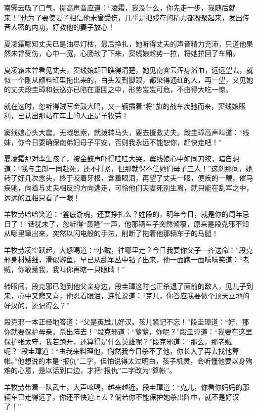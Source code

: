 \documentclass[12pt,oneside]{book}
\begin{document}
南霁云吸了口气，提高声音应道：``凌霜，我没什么，你先走一步，我随后就来！''他为了要使妻子相信他未曾受伤，几乎是把残存的精力都凝聚起来，发出传音人密的内功，好教他的妻子放心！

夏凌霜哪知丈夫已是油尽灯枯，最后挣扎，她听得丈夫的声音精力充沛，只道他果然未曾受伤，心中一宽，心肠软了下来，窦线娘趁势一拉，将她拉回了车厢。

夏凌霜未曾看见丈夫，窦线娘却已瞧得清楚，她见南霁云浑身浴血，远远望去，就似一个刚从颜料缸里拖出来的，白头发到脚跟，都染得通红的人，再一望，又见她的丈夫段圭璋和张巡亦已陷在重围之中，形势岌岌可危，不由得大吃一惊。

就在这时，忽听得贼军金鼓大鸣，又一辆插着``将''旗的战车疾驰而来，窦线娘眼利，已认出那站在车上的人正是羊牧劳！

窦线娘心头大震，无暇思索，就拨转马头，要去援救丈夫。段圭璋高声叫道：``线妹，你今日要确保南弟妇母子平安，否则我永远不能恕你，赶快走吧！''

夏凌霜那对孪生孩子，被金鼓声吓得哇哇大哭，窦线娘心中如同刀绞，暗自想道：``我与圭郎一同赴死，还不打紧，但那就保不住她们母子三人！''这刹那间，她转了好几次念头，终于咬着牙根，含着眼泪，再望了丈夫一眼，便疾的一鞭，催马疾驰，向着与丈夫相反的方向逃走，可怜他们夫妻死别生离，就只能在乱军之中，远远的互相只看了一眼！

羊牧劳哈哈笑道：``釜底游魂，还要挣扎么？姓段的，明年今日，就是你的周年忌日了！''话犹未了，忽听得``轰隆''一声，他那辆车子突然倾覆，原来是段克邪不知从哪里窜出来，突然以闪电般的手法，削断了拖着他那辆车子的马腿！

羊牧劳凌空跃起，大怒喝道：``小贼，往哪里走？今日我要你父子一齐送命！''段克邪身材矮细，滑似游鱼，早已从乱军丛中钻了出来，他一面跑一面嘻嘻笑道：``老贼，你敢惹我，我叫你再瞎一只眼睛！''

转眼间，段克邪已跑到他父亲身边，段圭璋这时也正杀退了面前的敌人，见儿子到来，心中又悲又喜，他忍着眼泪，连忙说道：``克儿，你答应我要做个顶天立地的好汉的，还记得么？''

段克邪一本正经地答道：``父是英雄儿好汉。孩儿紧记不忘！''段圭璋道：``好，那你就要保护母亲，杀出阵去！''段克邪道：``爹爹，你呢？''段圭璋道：``我要在这里保护张太守，我若跑开，还算得是什么英雄呢？''段克邪道：``那么，那老贼呢？''段圭璋道：``由我来料理他，倘然我今日杀不了他，你长大了再去找他算帐。''他想说的本是``报仇''二字，但怕说得太过明白，孩子机灵，会听懂他要以身殉难的心意，是以话到口边，才把``报仇''二字改为``算帐''。

羊牧劳带着一队武士，大声吆喝，越来越近。段圭璋道：``克儿，你看你妈妈的那辆车已走得远了，你还不快迫上去？倘若你不能保护她杀出阵中，就不是好汉了！''
\end{document}

